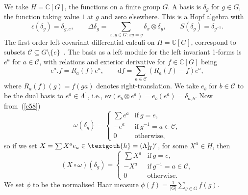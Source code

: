 \documentclass[pdftex]{sigma}
\numberwithin{equation}{section}
\newcommand{\ev}{\mathrm{ev}}
\newcommand{\extd}{\mathrm{d}}
\newcommand{\tens}{\mathop{\otimes}}
\newcommand{\C}{\mathbb{C}}
\newcommand{\<}{\langle}
\renewcommand{\>}{\rangle}
\begin{document}
 We take $ H=\C[G] $, the functions on a finite group $ G $. A basis is $ \delta_{g} $ for $ g\in G $, the function taking value $ 1 $ at $ g $ and zero elsewhere. This is a Hopf algebra with
 \[\epsilon (\delta_{g})=\delta_{g,e}, \qquad \Delta \delta_{g} = \sum_{ x,y\in G \colon xy=g}\delta_{x}\tens \delta_{y}, \qquad S(\delta_{g})=\delta_{g^{-1}}.\]
 The first-order left covariant differential calculi on $ H\!=\!\C[G]$, correspond to subsets $\mathcal{C}\!\subseteq\! G\setminus\{e\}$~\cite{KB}. The basis as a left module for the left invariant 1-forms is~$e^a$ for $a\in\mathcal{C}$, with relations and exterior derivative for $f\in \C[G]$ being
 \[ e^a.f=R_a(f) e^a,\qquad \extd
 f=\sum_{a\in {\mathcal{C}}}(R_a(f)-f) e^a,\]
 where $R_a(f)(g)=f(g a)$ denotes right-translation. We take $ e_{b} $ for $ b \in \mathcal{C} $ to be the dual basis to $ e^{a} \in \Lambda^{1} $, i.e., $ \ev (e_{b}\tens e^{a} )=e_{b} (e^{a})= \delta_{a,b} $. Now from~(\ref{e58})
\begin{equation*}
\omega(\delta_{g})=\begin{cases}
\sum e^{a} & \mbox{if} \ g=e, \\
- e^{a} & \mbox{if}\ g^{-1}=a \in \mathcal{C},\\
0 & \mbox{otherwise},
\end{cases}
\end{equation*}
so if we set $ X=\sum X^{a} e_{a} \in \textgoth{h}=(\Lambda_{H}^{1})'$, for some $ X^{a}\in H $, then{\samepage
 \begin{equation}\label{e51}
(X \circ \omega)(\delta_{g})=\begin{cases}
\sum X^{a} & \mbox{if} \ g=e, \\
- X^{a} & \mbox{if}\ g^{-1}=a \in \mathcal{C},\\
0 & \mbox{otherwise}.
\end{cases}
\end{equation}
 We set $ \phi $ to be the normalised Haar measure $ \phi(f)=\frac{1}{|G|}\sum_{g\in G}f (g) $.}
\end{document}
